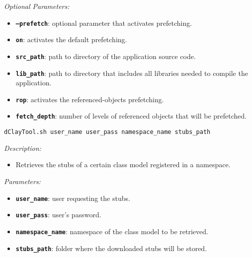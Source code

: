 \begin{dBox}
{\it Optional Parameters:}

\begin{itemize}
    \item \texttt{\bfseries --prefetch}: optional parameter that activates prefetching.
    \item \texttt{\bfseries on}: activates the default prefetching.
    \item \texttt{\bfseries src\_path}: path to directory of the application source code.
    \item \texttt{\bfseries lib\_path}: path to directory that includes all libraries needed to compile the application.
    \item \texttt{\bfseries rop}: activates the referenced-objects prefetching.
    \item \texttt{\bfseries fetch\_depth}: number of levels of referenced objects that will be prefetched.
\end{itemize}
 
\end{dBox}


\begin{dBox}
\texttt{dClayTool.sh  \newline user\_name user\_pass namespace\_name stubs\_path}
\LINE

{\it Description:}

\begin{itemize}
    \item Retrieves the stubs of a certain class model registered in a namespace. %
\end{itemize}

{\it Parameters:}

\begin{itemize}
    \item \texttt{\bfseries user\_name}: user requesting the stubs.
    \item \texttt{\bfseries user\_pass}: user's password.
    \item \texttt{\bfseries namespace\_name}: namespace of the class model to be retrieved.
    \item \texttt{\bfseries stubs\_path}: folder where the downloaded stubs will be stored.
\end{itemize}
 
\end{dBox}


